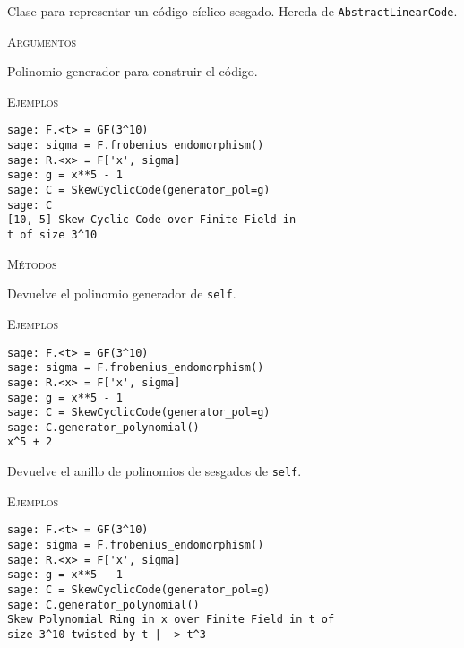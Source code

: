 \begin{description}[font=\ttfamily, style=nextline]
    \item[class SkewCyclicCode(self, generator\_pol=None)]

    Clase para representar un código cíclico sesgado. Hereda de \texttt{AbstractLinearCode}.

    \textsc{Argumentos}
    \begin{description}[font=\ttfamily, style=nextline]
        \item[generator\_pol] Polinomio generador para construir el código.
    \end{description}

    \textsc{Ejemplos}
    \begin{lstlisting}
sage: F.<t> = GF(3^10)
sage: sigma = F.frobenius_endomorphism()
sage: R.<x> = F['x', sigma]
sage: g = x**5 - 1
sage: C = SkewCyclicCode(generator_pol=g)
sage: C
[10, 5] Skew Cyclic Code over Finite Field in
t of size 3^10
    \end{lstlisting}

    \textsc{Métodos}
    \begin{description}[font=\ttfamily, style=nextline]
    \item[generator\_pol(self)]
    Devuelve el polinomio generador de \texttt{self}.

    \textsc{Ejemplos}
    \begin{lstlisting}
sage: F.<t> = GF(3^10)
sage: sigma = F.frobenius_endomorphism()
sage: R.<x> = F['x', sigma]
sage: g = x**5 - 1
sage: C = SkewCyclicCode(generator_pol=g)
sage: C.generator_polynomial()
x^5 + 2
    \end{lstlisting}

    \end{description}

    \begin{description}[font=\ttfamily, style=nextline]
    \item[skew\_polynomial\_ring(self)]
    Devuelve el anillo de polinomios de sesgados de \texttt{self}.

    \textsc{Ejemplos}
    \begin{lstlisting}
sage: F.<t> = GF(3^10)
sage: sigma = F.frobenius_endomorphism()
sage: R.<x> = F['x', sigma]
sage: g = x**5 - 1
sage: C = SkewCyclicCode(generator_pol=g)
sage: C.generator_polynomial()
Skew Polynomial Ring in x over Finite Field in t of
size 3^10 twisted by t |--> t^3
    \end{lstlisting}

    \end{description}

\end{description}

